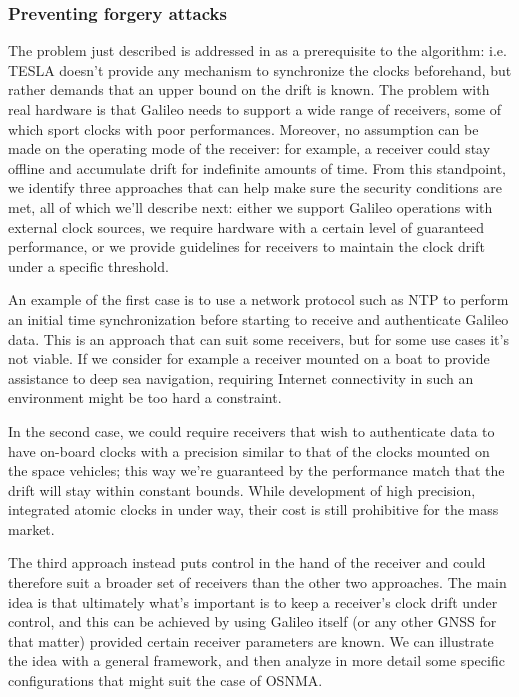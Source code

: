 \subsubsection{Preventing forgery attacks}
The problem just described is addressed in \cite{perrig} as a prerequisite to
the algorithm: i.e. TESLA doesn't provide any mechanism to synchronize
the clocks beforehand, but rather demands that an upper bound on the drift is
known. The problem with real hardware is that Galileo needs to support a wide
range of receivers, some of which sport clocks with poor performances. Moreover,
no assumption can be made on the operating mode of the receiver: for example,
a receiver could stay offline and accumulate drift for indefinite amounts of
time. From this standpoint, we identify three approaches that can help make sure
the security conditions are met, all of which we'll describe next: either we
support Galileo operations with external clock sources, we require hardware with
a certain level of guaranteed performance, or we provide guidelines for
receivers to maintain the clock drift under a specific threshold.

\vspace{\baselineskip}

An example of the first case is to use a network protocol such as NTP to perform
an initial time synchronization before starting to receive and authenticate
Galileo data. This is an approach that can suit some receivers, but for some use
cases it's not viable. If we consider for example a receiver mounted on a boat
to provide assistance to deep sea navigation, requiring Internet connectivity in
such an environment might be too hard a constraint.

In the second case, we could require receivers that wish to authenticate data to
have on-board clocks with a precision similar to that of the clocks mounted on
the space vehicles; this way we're guaranteed by the performance match that the
drift will stay within constant bounds. While development of high precision,
integrated atomic clocks in under way, their cost is still prohibitive for the
mass market.

The third approach instead puts control in the hand of the receiver and could
therefore suit a broader set of receivers than the other two approaches. The
main idea is that ultimately what's important is to keep a receiver's clock
drift under control, and this can be achieved by using Galileo itself (or any
other GNSS for that matter) provided certain receiver parameters are known. We
can illustrate the idea with a general framework, and then analyze in more
detail some specific configurations that might suit the case of OSNMA.

